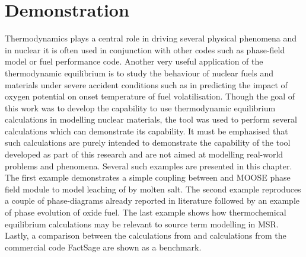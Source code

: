\chapter{Demonstration} \label{chap:results}
	Thermodynamics plays a central role in driving several physical phenomena and in nuclear it is often used in conjunction with other codes such as phase-field model or fuel performance code. Another very useful application of the thermodynamic equilibrium is to study the behaviour of nuclear fuels and materials under severe accident conditions such as in predicting the impact of oxygen potential on onset temperature of fuel volatilisation. Though the goal of this work was to develop the capability to use thermodynamic equilibrium calculations in modelling nuclear materials, the tool was used to perform several calculations which can demonstrate its capability. It must be emphasised that such calculations are purely intended to demonstrate the capability of the tool developed as part of this research and are not aimed at modelling real-world problems and phenomena. Several such examples are presented in this chapter. The first example demonstrates a simple coupling between {\GEM} and MOOSE phase field module to model leaching of  by molten  salt. The second example reproduces a couple of phase-diagrams already reported in literature followed by an example of phase evolution of oxide fuel. The last example shows how thermochemical equilibrium calculations may be relevant to source term modelling in MSR. Lastly, a comparison between the calculations from {\GEM} and calculations from the commercial code FactSage are shown as a benchmark.
	
